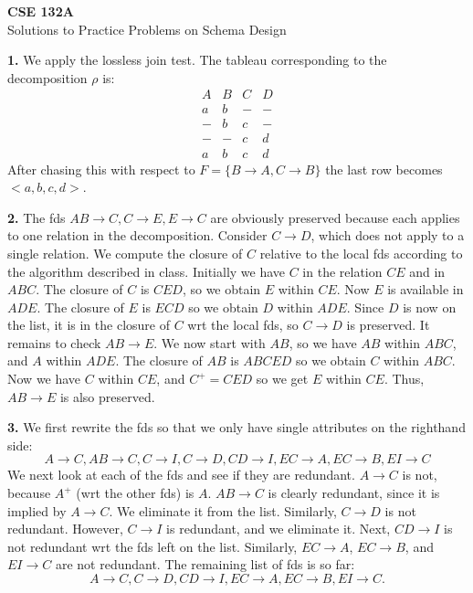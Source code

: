 

\begin{center}
{\bf CSE 132A} \\
{\Large Solutions to Practice Problems on Schema Design} \\
\end{center}



\vspace{4mm}
\noindent
{\bf 1.} We apply the lossless join test. The tableau corresponding to the decomposition $\rho$ is:
$$
\begin{array}{llll}
A & B & C & D \\ \hline
a & b & - & - \\
- & b & c & - \\
- & - & c & d\\ \hline
a & b & c & d
\end{array}
$$
After chasing this with respect to  $F = \{B \rightarrow A, C \rightarrow B\}$
the last row becomes $<a,b,c,d>$.

\vspace{4mm}
\noindent
{\bf 2.} The fds $AB \rightarrow C, C \rightarrow E, E \rightarrow C$ are obviously preserved
because each applies to one relation in the decomposition.
Consider $C \rightarrow D$, which does not apply to a single relation.
We compute the closure of $C$ relative to the local fds according to the
algorithm described in class. Initially we have $C$ in the relation $CE$
and in $ABC$. The closure of $C$ is $CED$, so we obtain $E$ within $CE$.
Now $E$ is available in $ADE$. The closure of $E$ is $ECD$ so we obtain $D$
within $ADE$. Since $D$ is now on the list, it is in the closure of $C$
wrt the local fds, so $C \rightarrow D$ is preserved.
It remains to check $AB \rightarrow E$. We now start with $AB$, so we have $AB$ within $ABC$, and $A$ within $ADE$. The closure of $AB$ is $ABCED$ so we obtain $C$ within 
$ABC$. Now we have $C$ within $CE$, and $C^+ = CED$ so we get $E$ within $CE$.
Thus, $AB \rightarrow E$ is also preserved.

\vspace{4mm}
\noindent
{\bf 3.} We first rewrite the fds so that we only have single attributes
on the righthand side:
$$A \rightarrow C, AB \rightarrow C, C \rightarrow I, C \rightarrow D, 
CD \rightarrow I, EC \rightarrow A, EC \rightarrow B, EI \rightarrow C$$
We next look at each of the fds and see if they are redundant.
$A \rightarrow C$ is not, because $A^+$ (wrt the other fds) is $A$.
$AB \rightarrow C$ is clearly redundant, since it is implied by $A \rightarrow C$. 
We eliminate it from the list.
Similarly, $C \rightarrow D$ is not redundant. However, $C \rightarrow I$ is redundant,
and we eliminate it. Next, $CD \rightarrow I$ is not redundant wrt the fds left on the list. Similarly, $EC \rightarrow A$, $EC \rightarrow B$, and $EI \rightarrow C$ are not redundant.
The remaining list of fds is so far:
$$A \rightarrow C, C \rightarrow D, 
CD \rightarrow I, EC \rightarrow A, EC \rightarrow B, EI \rightarrow C.$$

